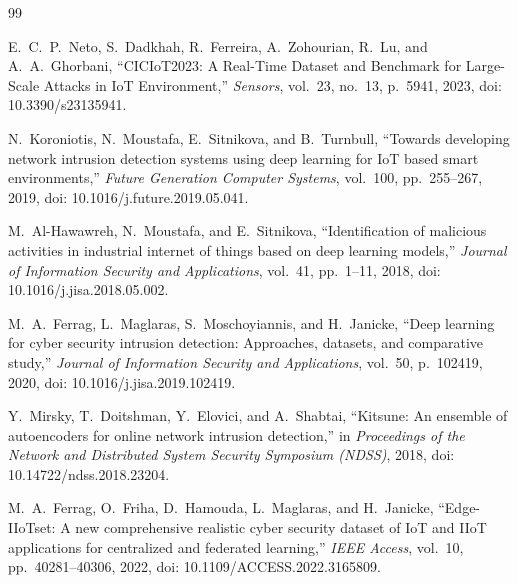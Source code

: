 \documentclass[12pt,a4paper]{report}
\begin{document}
\begin{thebibliography}{99}

E.~C.~P.~Neto, S.~Dadkhah, R.~Ferreira, A.~Zohourian, R.~Lu, and A.~A.~Ghorbani, ``CICIoT2023: A Real-Time Dataset and Benchmark for Large-Scale Attacks in IoT Environment,'' \emph{Sensors}, vol.~23, no.~13, p.~5941, 2023, doi: 10.3390/s23135941.

N.~Koroniotis, N.~Moustafa, E.~Sitnikova, and B.~Turnbull, ``Towards developing network intrusion detection systems using deep learning for IoT based smart environments,'' \emph{Future Generation Computer Systems}, vol.~100, pp.~255--267, 2019, doi: 10.1016/j.future.2019.05.041.

M.~Al-Hawawreh, N.~Moustafa, and E.~Sitnikova, ``Identification of malicious activities in industrial internet of things based on deep learning models,'' \emph{Journal of Information Security and Applications}, vol.~41, pp.~1--11, 2018, doi: 10.1016/j.jisa.2018.05.002.

M.~A.~Ferrag, L.~Maglaras, S.~Moschoyiannis, and H.~Janicke, ``Deep learning for cyber security intrusion detection: Approaches, datasets, and comparative study,'' \emph{Journal of Information Security and Applications}, vol.~50, p.~102419, 2020, doi: 10.1016/j.jisa.2019.102419.

Y.~Mirsky, T.~Doitshman, Y.~Elovici, and A.~Shabtai, ``Kitsune: An ensemble of autoencoders for online network intrusion detection,'' in \emph{Proceedings of the Network and Distributed System Security Symposium (NDSS)}, 2018, doi: 10.14722/ndss.2018.23204.

M.~A.~Ferrag, O.~Friha, D.~Hamouda, L.~Maglaras, and H.~Janicke, ``Edge-IIoTset: A new comprehensive realistic cyber security dataset of IoT and IIoT applications for centralized and federated learning,'' \emph{IEEE Access}, vol.~10, pp.~40281--40306, 2022, doi: 10.1109/ACCESS.2022.3165809.

\end{thebibliography}
\end{document}
